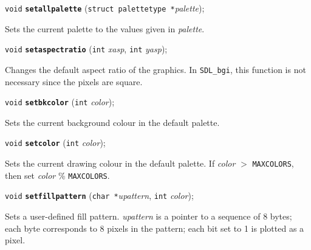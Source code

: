 \documentclass[a4paper,12pt]{article}
\newcommand{\SDLbgi}{\texttt{SDL\_bgi}}
\newcommand{\V}{\texttt{void}}      %
\newcommand{\I}{\texttt{int}}       %
\newcommand{\C}{\texttt{char *}}    %
\newcommand{\func}[1]{\textbf{\texttt{#1}}}  %
\newcommand{\A}[1]{\emph{#1}}       %
\newcommand{\T}[1]{\texttt{#1}}     %
\newenvironment{bgi}
{ %
  \begin{snugshade}
}
{ %
  \end{snugshade}
}
\begin{document}

\label{sec:setallpalette}

\begin{bgi}
\V{} \func{setallpalette} (\texttt{struct palettetype *}\A{palette});
\end{bgi}

Sets the current palette to the values given in \A{palette}.


\label{sec:setaspectratio}

\begin{bgi}
\V{} \func{setaspectratio} (\I{} \A{xasp}, \I{} \A{yasp});
\end{bgi}

Changes the default aspect ratio of the graphics. In \SDLbgi, this
function is not necessary since the pixels are square.


\label{sec:setbkcolor}

\begin{bgi}
\V{} \func{setbkcolor} (\I{} \A{color});
\end{bgi}

Sets the current background colour in the default palette.


\label{sec:setcolor}

\begin{bgi}
\V{} \func{setcolor} (\I{} \A{color});
\end{bgi}

Sets the current drawing colour in the default palette. If \A{color}
$>$ \T{MAXCOLORS}, then set \A{color} \% \T{MAXCOLORS}.


\label{sec:setfillpattern}

\begin{bgi}
\V{} \func{setfillpattern} (\C{}\A{upattern}, \I{} \A{color});
\end{bgi}

Sets a user-defined fill pattern. \A{upattern} is a pointer to a
sequence of 8 bytes; each byte corresponds to 8 pixels in the pattern;
each bit set to 1 is plotted as a pixel.
\end{document}

